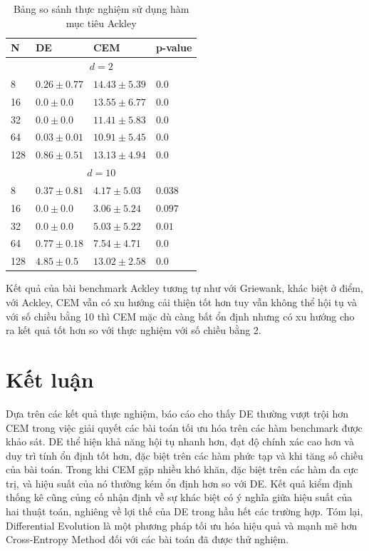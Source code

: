 \documentclass[10pt]{report}
\begin{document}
\begin{table}[H]\centering
	\caption{Bảng so sánh thực nghiệm sử dụng hàm mục tiêu Ackley}
	\begin{tabularx}{0.8\textwidth}{p{5em}XXl}
		\toprule
		\textbf{N} & \textbf{DE}                & \textbf{CEM}       & \textbf{p-value}   \\
		\midrule
		\multicolumn{4}{c}{\(d = 2\)}                                                     \\
		\midrule
		8          & \(\mathbf{0.26 \pm 0.77}\) & \(14.43 \pm 5.39\) & \(\mathbf{0.0}\)   \\
		16         & \(\mathbf{0.0 \pm 0.0}\)   & \(13.55 \pm 6.77\) & \(\mathbf{0.0}\)   \\
		32         & \(\mathbf{0.0 \pm 0.0}\)   & \(11.41 \pm 5.83\) & \(\mathbf{0.0}\)   \\
		64         & \(\mathbf{0.03 \pm 0.01}\) & \(10.91 \pm 5.45\) & \(\mathbf{0.0}\)   \\
		128        & \(\mathbf{0.86 \pm 0.51}\) & \(13.13 \pm 4.94\) & \(\mathbf{0.0}\)   \\
		\midrule
		\multicolumn{4}{c}{\(d = 10\)}                                                    \\
		\midrule
		8          & \(\mathbf{0.37 \pm 0.81}\) & \(4.17 \pm 5.03\)  & \(\mathbf{0.038}\) \\
		16         & \(\mathbf{0.0 \pm 0.0}\)   & \(3.06 \pm 5.24\)  & \(0.097\)          \\
		32         & \(\mathbf{0.0 \pm 0.0}\)   & \(5.03 \pm 5.22\)  & \(\mathbf{0.01}\)  \\
		64         & \(\mathbf{0.77 \pm 0.18}\) & \(7.54 \pm 4.71\)  & \(\mathbf{0.0}\)   \\
		128        & \(\mathbf{4.85 \pm 0.5}\)  & \(13.02 \pm 2.58\) & \(\mathbf{0.0}\)   \\
		\bottomrule
	\end{tabularx}
\end{table}

Kết quả của bài benchmark Ackley tương tự như với Griewank, khác biệt ở điểm, với Ackley, CEM vẫn có xu hướng cải thiện tốt hơn tuy vẫn không thể hội tụ và với số chiều bằng 10 thì CEM mặc dù càng bất ổn định nhưng có xu hướng cho ra kết quả tốt hơn so với thực nghiệm với số chiều bằng 2.

\chapter{Kết luận}
Dựa trên các kết quả thực nghiệm, báo cáo cho thấy DE thường vượt trội hơn CEM trong việc giải quyết các bài toán tối ưu hóa trên các hàm benchmark được khảo sát. DE thể hiện khả năng hội tụ nhanh hơn, đạt độ chính xác cao hơn và duy trì tính ổn định tốt hơn, đặc biệt trên các hàm phức tạp và khi tăng số chiều của bài toán. Trong khi CEM gặp nhiều khó khăn, đặc biệt trên các hàm đa cực trị, và hiệu suất của nó thường kém ổn định hơn so với DE. Kết quả kiểm định thống kê cũng củng cố nhận định về sự khác biệt có ý nghĩa giữa hiệu suất của hai thuật toán, nghiêng về lợi thế của DE trong hầu hết các trường hợp. Tóm lại, Differential Evolution là một phương pháp tối ưu hóa hiệu quả và mạnh mẽ hơn Cross-Entropy Method đối với các bài toán đã được thử nghiệm.
\end{document}
